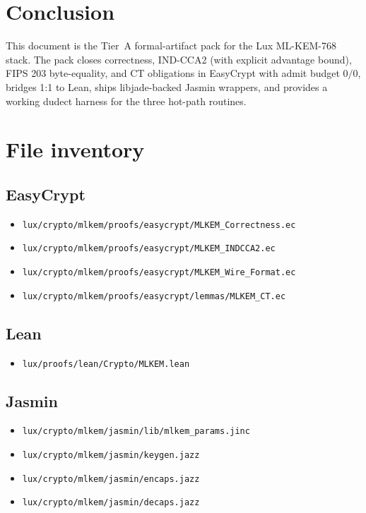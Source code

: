 \documentclass[11pt,a4paper]{article}
\begin{document}
\section{Conclusion}

This document is the Tier~A formal-artifact pack for the Lux
ML-KEM-768 stack. The pack closes correctness, IND-CCA2 (with
explicit advantage bound), FIPS 203 byte-equality, and CT
obligations in EasyCrypt with admit budget $0/0$, bridges 1:1 to
Lean, ships libjade-backed Jasmin wrappers, and provides a working
dudect harness for the three hot-path routines.

\appendix

\section{File inventory}

\subsection*{EasyCrypt}
\begin{itemize}
\item \texttt{lux/crypto/mlkem/proofs/easycrypt/MLKEM\_Correctness.ec}
\item \texttt{lux/crypto/mlkem/proofs/easycrypt/MLKEM\_INDCCA2.ec}
\item \texttt{lux/crypto/mlkem/proofs/easycrypt/MLKEM\_Wire\_Format.ec}
\item \texttt{lux/crypto/mlkem/proofs/easycrypt/lemmas/MLKEM\_CT.ec}
\end{itemize}

\subsection*{Lean}
\begin{itemize}
\item \texttt{lux/proofs/lean/Crypto/MLKEM.lean}
\end{itemize}

\subsection*{Jasmin}
\begin{itemize}
\item \texttt{lux/crypto/mlkem/jasmin/lib/mlkem\_params.jinc}
\item \texttt{lux/crypto/mlkem/jasmin/keygen.jazz}
\item \texttt{lux/crypto/mlkem/jasmin/encaps.jazz}
\item \texttt{lux/crypto/mlkem/jasmin/decaps.jazz}
\end{itemize}
\end{document}
